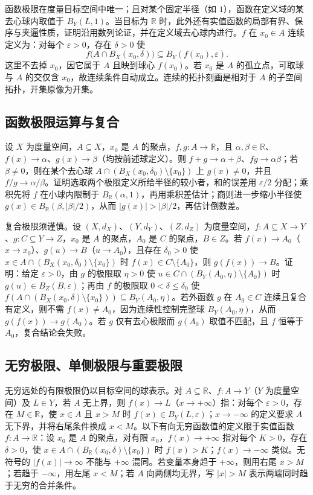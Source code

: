 \documentclass[11pt,a4paper,UTF8]{ctexart}
\theoremstyle{definition}\newtheorem{definition}[theorem]{定义}
\theoremstyle{remark}\newtheorem{remark}[theorem]{说明}
\begin{document}
函数极限在度量目标空间中唯一；且对某个固定半径（如 $1$），函数在定义域的某去心球内取值于 $B_Y(L,1)$。当目标为 $\mathbb R$ 时，此外还有实值函数的局部有界、保序与夹逼性质，证明沿用数列论证，并在定义域去心球内进行。$f$ 在 $x_0\in A$ 连续定义为：对每个 $\varepsilon>0$，存在 $\delta>0$ 使
\[
f\bigl(A\cap B_X(x_0,\delta)\bigr)\subseteq B_Y(f(x_0),\varepsilon).
\]
这里不去掉 $x_0$，因它属于 $A$ 且映到球心 $f(x_0)$。若 $x_0$ 是 $A$ 的孤立点，可取球与 $A$ 的交仅含 $x_0$，故连续条件自动成立。连续的拓扑刻画是相对于 $A$ 的子空间拓扑，开集原像为开集。

\subsection{函数极限运算与复合}
设 $X$ 为度量空间，$A\subseteq X$，$x_0$ 是 $A$ 的聚点，$f,g:A\to\mathbb R$，且 $\alpha,\beta\in\mathbb R$、$f(x)\to \alpha$、$g(x)\to\beta$（均按前述球定义）。则 $f+g\to\alpha+\beta$、$fg\to\alpha\beta$；若 $\beta\ne0$，则在某个去心球 $A\cap(B_X(x_0,\delta_0)\setminus\{x_0\})$ 上 $g(x)\ne0$，并且 $f/g\to\alpha/\beta$。证明选取两个极限定义所给半径的较小者，和的误差用 $\varepsilon/2$ 分配；乘积先将 $f$ 在小球内限制于 $B_{\mathbb R}(\alpha,1)$，再用乘积差估计；商则进一步缩小半径使 $g(x)\in B_{\mathbb R}(\beta,|\beta|/2)$，从而 $|g(x)|>|\beta|/2$，再估计倒数差。

复合极限须谨慎。设 $(X,d_X)$、$(Y,d_Y)$、$(Z,d_Z)$ 为度量空间，$f:A\subseteq X\to Y$、$g:C\subseteq Y\to Z$，$x_0$ 是 $A$ 的聚点，$A_0$ 是 $C$ 的聚点，$B\in Z$。若 $f(x)\to A_0$（$x\to x_0$）、$g(u)\to B$（$u\to A_0$），且存在 $\delta_0>0$ 使 $x\in A\cap(B_X(x_0,\delta_0)\setminus\{x_0\})$ 时 $f(x)\in C\setminus\{A_0\}$，则 $g(f(x))\to B$。证明：给定 $\varepsilon>0$，由 $g$ 的极限取 $\eta>0$ 使 $u\in C\cap(B_Y(A_0,\eta)\setminus\{A_0\})$ 时 $g(u)\in B_Z(B,\varepsilon)$；再由 $f$ 的极限取 $0<\delta\le\delta_0$ 使 $f(A\cap(B_X(x_0,\delta)\setminus\{x_0\}))\subseteq B_Y(A_0,\eta)$。若外函数 $g$ 在 $A_0\in C$ 连续且复合有定义，则不需 $f(x)\ne A_0$，因为连续性控制完整球 $B_Y(A_0,\eta)$，从而 $g(f(x))\to g(A_0)$。若 $g$ 仅有去心极限而 $g(A_0)$ 取值不匹配，且 $f$ 恒等于 $A_0$，复合结论会失败。

\subsection{无穷极限、单侧极限与重要极限}
无穷远处的有限极限仍以目标空间的球表示。对 $A\subseteq\mathbb R$、$f:A\to Y$（$Y$ 为度量空间）及 $L\in Y$，若 $A$ 无上界，则 $f(x)\to L$（$x\to+\infty$）指：对每个 $\varepsilon>0$，存在 $M\in\mathbb R$，使 $x\in A$ 且 $x>M$ 时 $f(x)\in B_Y(L,\varepsilon)$；$x\to-\infty$ 的定义要求 $A$ 无下界，并将右尾条件换成 $x<M$。以下有向无穷函数值的定义限于实值函数 $f:A\to\mathbb R$：设 $x_0$ 是 $A$ 的聚点，对有限 $x_0$，$f(x)\to+\infty$ 指对每个 $K>0$，存在 $\delta>0$，使 $x\in A\cap(B_{\mathbb R}(x_0,\delta)\setminus\{x_0\})$ 时 $f(x)>K$；$f(x)\to-\infty$ 类似。无符号的 $|f(x)|\to\infty$ 不能与 $+\infty$ 混同。若变量本身趋于 $+\infty$，则用右尾 $x>M$；若趋于 $-\infty$，用左尾 $x<M$；若 $A$ 向两侧均无界，写 $|x|>M$ 表示两端同时趋于无穷的合并条件。
\end{document}
